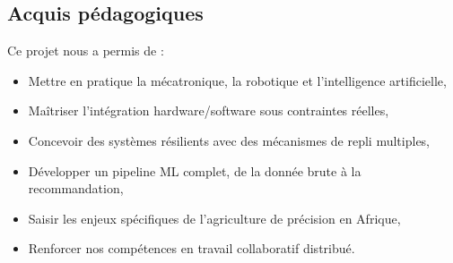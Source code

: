 \documentclass[a4paper,12pt,openany,titlepage]{scrartcl}
\begin{document}
\subsection{Acquis pédagogiques}
Ce projet nous a permis de :
\begin{itemize}[nosep]
    \item Mettre en pratique la mécatronique, la robotique et l’intelligence artificielle,
    \item Maîtriser l’intégration hardware/software sous contraintes réelles,
    \item Concevoir des systèmes résilients avec des mécanismes de repli multiples,
    \item Développer un pipeline ML complet, de la donnée brute à la recommandation,
    \item Saisir les enjeux spécifiques de l’agriculture de précision en Afrique,
    \item Renforcer nos compétences en travail collaboratif distribué.
\end{itemize}

\newpage
\end{document}
